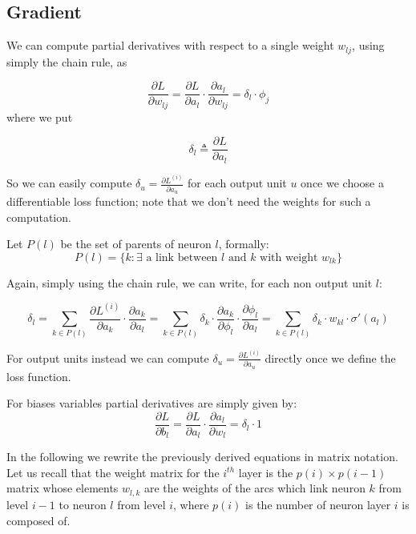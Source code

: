 \subsection{Gradient}

We can compute partial derivatives with respect to a single weight $w_{lj}$, using simply the chain rule, as 

$$\frac{\partial L}{\partial w_{lj}}=\frac{\partial L}{\partial a_l} \cdot \frac{\partial a_l}{\partial w_{lj}}=\delta_l \cdot \phi_j$$
where we put

\begin{equation}
\delta_l \triangleq \frac{\partial L}{\partial a_l}
\end{equation}



So we can easily compute $\delta_u = \frac{\partial L^{(i)}}{\partial a_u} $ for each output unit $u$ once we choose a differentiable loss function; note
that we don't need the weights for such a computation. 

Let $P(l)$ be the set of parents of neuron $l$, formally:
\begin{equation} 
P(l) = \{ k: \exists \text{ a link between $l$ and $k$ with weight } w_{lk} \}
\end{equation}

Again, simply using the chain rule, we can write, for each non output unit $l$:

\begin{equation}
\label{loss_deriv}
\delta_l = \sum_{k\in P(l)} \frac{\partial L^{(i)}}{\partial a_k} \cdot \frac{\partial a_k}{\partial a_l}= \sum_{k\in P(l)} \delta_k \cdot 
\frac{\partial a_k}{\partial \phi_l} \cdot \frac{\partial \phi_l}{\partial a_l} = \sum_{k\in P(l)} \delta_k \cdot 
w_{kl} \cdot \sigma'(a_l)
\end{equation}


For output units instead we can compute $\delta_u = \frac{\partial L^{(i)}}{\partial a_u} $ directly once we define the loss function.

For biases variables partial derivatives are simply given by:
$$\frac{\partial L}{\partial b_{l}}=\frac{\partial L}{\partial a_l} \cdot \frac{\partial a_l}{\partial w_{l}}=\delta_l \cdot 1$$




In the following we rewrite the previously derived equations in matrix notation.
Let us recall that the weight matrix for the $i^{th}$ layer is the $p(i) \times p(i-1)$ matrix whose elements $w_{l,k}$ are the weights of the arcs which link neuron $k$ from level $i-1$ to neuron $l$ from level $i$, where
$p(i)$ is the number of neuron layer $i$ is composed of.


